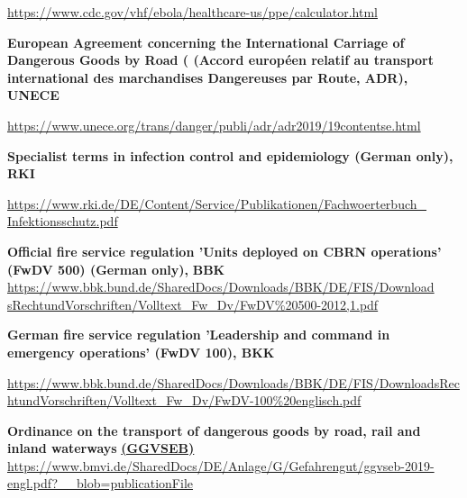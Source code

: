 \documentclass{article}
\begin{document}
\href{https://www.cdc.gov/vhf/ebola/healthcare-us/ppe/calculator.html}{https://www.cdc.gov/vhf/ebola/healthcare-us/ppe/calculator.html}


\textbf{European Agreement concerning the International Carriage of Dangerous Goods by Road ( (Accord européen relatif au transport international des marchandises Dangereuses par Route, ADR), UNECE}


\href{https://www.unece.org/trans/danger/publi/adr/adr2019/19contentse.html}{https://www.unece.org/trans/danger/publi/adr/adr2019/19contentse.html}


\textbf{Specialist terms in infection control and epidemiology (German only), RKI} 


\href{https://www.rki.de/DE/Content/Service/Publikationen/Fachwoerterbuch_Infektionsschutz.pdf?__blob=publicationFile}{https://www.rki.de/DE/Content/Service/Publikationen/Fachwoerterbuch\_} \href{https://www.rki.de/DE/Content/Service/Publikationen/Fachwoerterbuch_Infektionsschutz.pdf?__blob=publicationFile}{Infektionsschutz.pdf}


\textbf{Official fire service regulation 'Units deployed on CBRN operations' (FwDV 500) (German only),} \textbf{BBK }\href{https://www.bbk.bund.de/SharedDocs/Downloads/BBK/DE/FIS/DownloadsRechtundVorschriften/Volltext_Fw_Dv/FwDV%20500-2012,1.pdf;jsessionid=3BA3A43E8BA30225A703411AEEE48E8A.1_cid320?__blob=publicationFile}{https://www.bbk.bund.de/SharedDocs/Downloads/BBK/DE/FIS/Download} \href{https://www.bbk.bund.de/SharedDocs/Downloads/BBK/DE/FIS/DownloadsRechtundVorschriften/Volltext_Fw_Dv/FwDV%20500-2012,1.pdf;jsessionid=3BA3A43E8BA30225A703411AEEE48E8A.1_cid320?__blob=publicationFile}{sRechtundVorschriften/Volltext\_Fw\_Dv/FwDV\%20500-2012,1.pdf}


\textbf{German fire service regulation 'Leadership and command in emergency operations' (FwDV 100), BKK}


\href{https://www.bbk.bund.de/SharedDocs/Downloads/BBK/DE/FIS/DownloadsRechtundVorschriften/Volltext_Fw_Dv/FwDV-100%20englisch.pdf?__blob=publicationFile}{https://www.bbk.bund.de/SharedDocs/Downloads/BBK/DE/FIS/DownloadsRechtundVorschriften/Volltext\_Fw\_Dv/FwDV-100\%20englisch.pdf}


\textbf{Ordinance on the transport of dangerous goods by road, rail and inland waterways }\textbf{\href{https://www.bmvi.de/SharedDocs/DE/Anlage/G/Gefahrengut/ggvseb-2019-engl.pdf?__blob=publicationFile}{(GGVSEB) }}\href{https://www.bmvi.de/SharedDocs/DE/Anlage/G/Gefahrengut/ggvseb-2019-engl.pdf?__blob=publicationFile}{https://www.bmvi.de/SharedDocs/DE/Anlage/G/Gefahrengut/ggvseb-2019-engl.pdf?\_\_blob=publicationFile}
\end{document}
